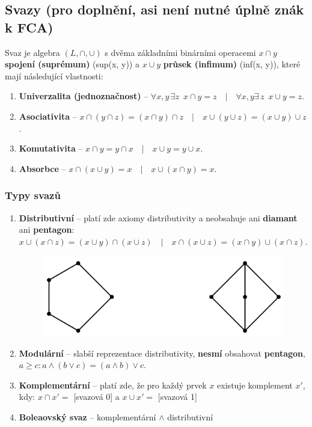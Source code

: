 \subsection{Svazy (pro doplnění, asi není nutné úplně znák k FCA)}
Svaz je algebra $(L, \cap, \cup)$ s dvěma základními binárními operacemi $x\cap{}y$ \textbf{spojení (suprémum)} (sup(x, y)) a $x\cup{}y$ \textbf{průsek (infimum)} (inf(x, y)), které mají následující vlastnosti:
\begin{enumerate}
\item \textbf{Univerzalita (jednoznačnost)} -- $\forall x,y \,\exists z \,\,\, x \cap y = z\quad|\quad\forall x,y \exists\, z \,\,\, x \cup y = z$.
\item \textbf{Asociativita} -- $x \cap (y \cap z) = (x \cap y) \cap z \quad|\quad x \cup (y \cup z) = (x \cup y) \cup z$.
\item \textbf{Komutativita} -- $x \cap y = y \cap x \quad|\quad x \cup y = y \cup x$.
\item \textbf{Absorbce} -- $x \cap (x \cup y) = x \quad|\quad x \cup (x \cap y) = x $.
\end{enumerate}

\subsubsection{Typy svazů}
\begin{enumerate}
\item \textbf{Distributivní} -- platí zde axiomy distributivity a neobsahuje ani \textbf{diamant} ani \textbf{pentagon}: $x \cup (x \cap z) = (x \cup y) \cap (x \cup z) \quad|\quad x \cap (x \cup z) = (x \cap y) \cup (x \cap z) $.

\begin{figure}[H]
	\centering
	\includegraphics[width=.4\textwidth]{assets/pentagon_diamant}
\end{figure}
\item \textbf{Modulární} -- slabší reprezentace distributivity, \textbf{nesmí} obsahovat \textbf{pentagon}, $a \geq c: a \land (b \lor c) = (a \land b) \lor c$.
\item \textbf{Komplementární} -- platí zde, že pro každý prvek $ x $ existuje komplement $x' $, kdy: $x \cap x' = $ [svazová 0] a $x \cup x' = $ [svazová 1]
\item \textbf{Boleaovský svaz} -- komplementární $\land$ distributivní
\end{enumerate}


